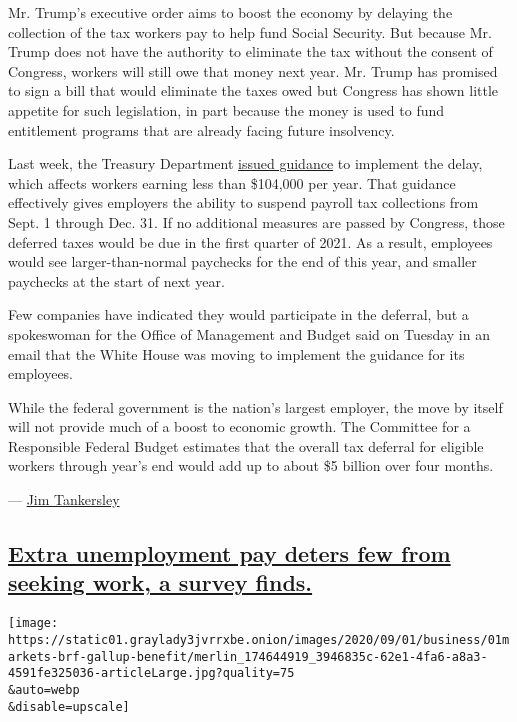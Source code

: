 Mr. Trump's executive order aims to boost the economy by delaying the
collection of the tax workers pay to help fund Social Security. But
because Mr. Trump does not have the authority to eliminate the tax
without the consent of Congress, workers will still owe that money next
year. Mr. Trump has promised to sign a bill that would eliminate the
taxes owed but Congress has shown little appetite for such legislation,
in part because the money is used to fund entitlement programs that are
already facing future insolvency.

Last week, the Treasury Department
\href{https://www.irs.gov/pub/irs-drop/n-20-65.pdf}{issued guidance} to
implement the delay, which affects workers earning less than \$104,000
per year. That guidance effectively gives employers the ability to
suspend payroll tax collections from Sept. 1 through Dec. 31. If no
additional measures are passed by Congress, those deferred taxes would
be due in the first quarter of 2021. As a result, employees would see
larger-than-normal paychecks for the end of this year, and smaller
paychecks at the start of next year.

Few companies have indicated they would participate in the deferral, but
a spokeswoman for the Office of Management and Budget said on Tuesday in
an email that the White House was moving to implement the guidance for
its employees.

While the federal government is the nation's largest employer, the move
by itself will not provide much of a boost to economic growth. The
Committee for a Responsible Federal Budget estimates that the overall
tax deferral for eligible workers through year's end would add up to
about \$5 billion over four months.

--- \href{https://www.nytimes3xbfgragh.onion/by/jim-tankersley}{Jim
Tankersley}

\hypertarget{extra-unemployment-pay-deters-few-from-seeking-work-a-survey-finds}{%
\subsection{\texorpdfstring{\protect\hyperlink{extra-unemployment-pay-deters-few-from-seeking-work-a-survey-finds}{Extra
unemployment pay deters few from seeking work, a survey
finds.}}{Extra unemployment pay deters few from seeking work, a survey finds.}}\label{extra-unemployment-pay-deters-few-from-seeking-work-a-survey-finds}}

\texttt{[image: https://static01.graylady3jvrrxbe.onion/images/2020/09/01/business/01markets-brf-gallup-benefit/merlin\_174644919\_3946835c-62e1-4fa6-a8a3-4591fe325036-articleLarge.jpg?quality=75\\\&auto=webp\\\&disable=upscale]}

